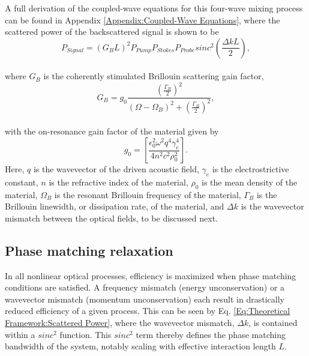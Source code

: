 \documentclass[%
  reprint,
  superscriptaddress,
  amsmath,amssymb,
  aps,
  prapplied,
]{revtex4-2}
\begin{document}
A full derivation of the coupled-wave equations for this four-wave mixing process can be found in Appendix \ref{Appendix:Coupled-Wave Equations}, where the scattered power of the backscattered signal is shown to be
\\
\begin{equation}
  P_{Signal} = (G_{B}L)^{2}P_{Pump}P_{Stokes}P_{Probe}sinc^{2}\left(\frac{\Delta kL}{2}\right),
  \label{Eq:Theoretical Framework:Scattered Power}
\end{equation}
\\
where $G_{B}$ is the coherently stimulated Brillouin scattering gain factor,
\\
\begin{equation}
  G_{B} = g_{0}\frac{\left(\frac{\Gamma_{B}}{2}\right)^{2}}{(\Omega - \Omega_{B})^{2} + \left(\frac{\Gamma_{B}}{2}\right)^{2}},
\end{equation}
\\
with the on-resonance gain factor of the material given by
\\
\begin{equation}
  g_{0} = \left[\frac{\epsilon_{0}^{2}\omega^{2}q^{4}\gamma_{e}^{4}}{4n^{2}c^{2}\rho_{0}^{2}}\right].
\end{equation}
Here, $q$ is the wavevector of the driven acoustic field, $\gamma_{e}$ is the electrostrictive constant, $n$ is the refractive index of the material, $\rho_{0}$ is the mean density of the material, $\Omega_{B}$ is the resonant Brillouin frequency of the material, $\Gamma_{B}$ is the Brillouin linewidth, or dissipation rate, of the material, and $\Delta k$ is the wavevector mismatch between the optical fields, to be discussed next.


\subsection*{Phase matching relaxation}\label{Theoretical Framework: Phase matching relaxation}
In all nonlinear optical processes, efficiency is maximized when phase matching conditions are satisfied. A frequency mismatch (energy unconservation) or a wavevector mismatch (momentum unconservation) each result in drastically reduced efficiency of a given process.\cite{maker1962effects} This can be seen by Eq. \ref{Eq:Theoretical Framework:Scattered Power}, where the wavevector mismatch, $\Delta k$, is contained within a $sinc^{2}$ function. This $sinc^{2}$ term thereby defines the phase matching bandwidth of the system, notably scaling with effective interaction length $L$.
\end{document}
